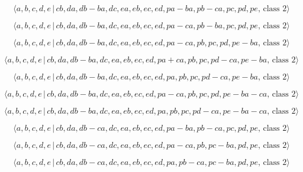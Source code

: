 \documentclass[10pt]{article}
\begin{document}
\begin{equation}
\langle a,b,c,d,e\,|\,cb,da,db-ba,dc,ea,eb,ec,ed,pa-ba,pb-ca,pc,pd,pe,\,%
\text{class }2\rangle  \tag{7.4651}
\end{equation}

\begin{equation}
\langle a,b,c,d,e\,|\,cb,da,db-ba,dc,ea,eb,ec,ed,pa-ca,pb-ba,pc,pd,pe,\,%
\text{class }2\rangle  \tag{7.4652}
\end{equation}

\begin{equation}
\langle a,b,c,d,e\,|\,cb,da,db-ba,dc,ea,eb,ec,ed,pa-ca,pb,pc,pd,pe-ba,\,%
\text{class }2\rangle  \tag{7.4653}
\end{equation}

\begin{equation}
\langle a,b,c,d,e\,|\,cb,da,db-ba,dc,ea,eb,ec,ed,pa+ca,pb,pc,pd-ca,pe-ba,\,%
\text{class }2\rangle  \tag{7.4654}
\end{equation}

\begin{equation}
\langle a,b,c,d,e\,|\,cb,da,db-ba,dc,ea,eb,ec,ed,pa,pb,pc,pd-ca,pe-ba,\,%
\text{class }2\rangle  \tag{7.4655}
\end{equation}

\begin{equation}
\langle a,b,c,d,e\,|\,cb,da,db-ba,dc,ea,eb,ec,ed,pa-ca,pb,pc,pd,pe-ba-ca,\,%
\text{class }2\rangle  \tag{7.4656}
\end{equation}

\begin{equation}
\langle a,b,c,d,e\,|\,cb,da,db-ba,dc,ea,eb,ec,ed,pa,pb,pc,pd-ca,pe-ba-ca,\,%
\text{class }2\rangle  \tag{7.4657}
\end{equation}

\begin{equation}
\langle a,b,c,d,e\,|\,cb,da,db-ca,dc,ea,eb,ec,ed,pa-ba,pb-ca,pc,pd,pe,\,%
\text{class }2\rangle  \tag{7.4658}
\end{equation}

\begin{equation}
\langle a,b,c,d,e\,|\,cb,da,db-ca,dc,ea,eb,ec,ed,pa-ca,pb,pc-ba,pd,pe,\,%
\text{class }2\rangle  \tag{7.4659}
\end{equation}

\begin{equation}
\langle a,b,c,d,e\,|\,cb,da,db-ca,dc,ea,eb,ec,ed,pa,pb-ca,pc-ba,pd,pe,\,%
\text{class }2\rangle  \tag{7.4660}
\end{equation}
\end{document}

